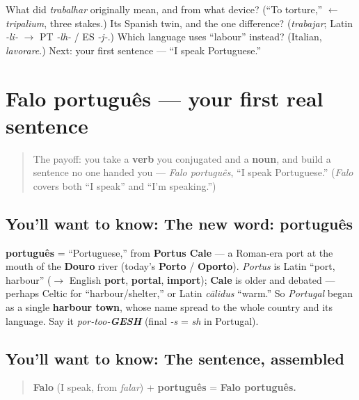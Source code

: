 \begin{tcolorbox}[breakable,colback=teal!4,colframe=teal!35!black,title={Before you move on}]
What did \emph{trabalhar} originally mean, and from what device? (\textquotedblleft{}To torture,\textquotedblright{} $\leftarrow$ \emph{tripalium}, three stakes.) Its Spanish twin, and the one difference? (\emph{trabajar}; Latin \emph{-li-} $\to$ PT \emph{-lh-} / ES \emph{-j-}.) Which language uses \textquotedblleft{}labour\textquotedblright{} instead? (Italian, \emph{lavorare}.) Next: your first sentence — \textquotedblleft{}I speak Portuguese.\textquotedblright{}
\end{tcolorbox}
\section[Falo português]{Falo português — your first real sentence}

\label{lesson:PT-C05-falo-portugues}



\begin{quote}
The payoff: you take a \textbf{verb} you conjugated and a \textbf{noun}, and build a sentence no one handed you — \emph{Falo português}, \textquotedblleft{}I speak Portuguese.\textquotedblright{} (\emph{Falo} covers both \textquotedblleft{}I speak\textquotedblright{} and \textquotedblleft{}I'm speaking.\textquotedblright{})
\end{quote}

\subsection*{You'll want to know: The new word: português}
\textbf{português} = \textquotedblleft{}Portuguese,\textquotedblright{} from \textbf{Portus Cale} — a Roman-era port at the mouth of the \textbf{Douro} river (today's \textbf{Porto} / \textbf{Oporto}). \emph{Portus} is Latin \textquotedblleft{}port, harbour\textquotedblright{} ($\to$ English \textbf{port}, \textbf{portal}, \textbf{import}); \textbf{Cale} is older and debated — perhaps Celtic for \textquotedblleft{}harbour/shelter,\textquotedblright{} or Latin \emph{cālidus} \textquotedblleft{}warm.\textquotedblright{} So \emph{Portugal} began as a single \textbf{harbour town}, whose name spread to the whole country and its language. Say it \emph{por-too-\textbf{GESH}} (final \emph{-s} = \emph{sh} in Portugal).

\subsection*{You'll want to know: The sentence, assembled}
\begin{quote}
\textbf{Falo} (I speak, from \emph{falar}) + \textbf{português} = \textbf{Falo português.}
\end{quote}

